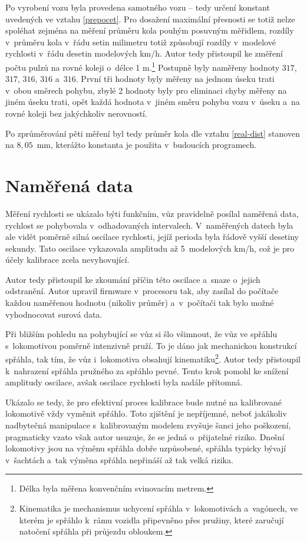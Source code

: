 Po vyrobení vozu byla provedena  samotného vozu -- tedy určení
konstant uvedených ve vztahu \ref{prepocet}. Pro dosažení maximální přesnosti
se totiž nelze spoléhat zejména na měření průměru kola pouhým posuvným
měřidlem, rozdíly v~průměru kola v~řádu setin milimetru totiž způsobují rozdíly
v~modelové rychlosti v~řádu desetin modelových km/h. Autor tedy přistoupil ke
změření počtu pulzů na rovné koleji o~délce 1 m.\footnote{Délka byla měřena
konvenčním svinovacím metrem.} Postupně byly naměřeny hodnoty $317$, $317$,
$316$, $316$ a~$316$. První tři hodnoty byly měřeny na jednom úseku trati
v~obou směrech pohybu, zbylé 2 hodnoty byly pro eliminaci chyby měřeny na
jiném úseku trati, opět každá hodnota v~jiném směru pohybu vozu v~úseku a~na
rovné koleji bez jakýchkoliv nerovností.

Po zprůměrování pěti měření byl tedy průměr kola dle vztahu \ref{real-dist}
stanoven na $8,05$~mm, kterážto konstanta je použita v~budoucích programech.

\section{Naměřená data}
\label{sec:wsm-data}

Měření rychlosti se ukázalo býti funkčním, vůz pravidelně posílal naměřená
data, rychlost se pohybovala v~odhadovaných intervalech. V~naměřených datech
byla ale vidět poměrně silná oscilace rychlosti, jejíž perioda byla řádově
vyšší desetiny sekundy. Tato oscilace vykazovala amplitudu až
5~modelových km/h, což je pro účely kalibrace zcela nevyhovující.

Autor tedy přistoupil ke zkoumání příčin této oscilace a~snaze o~jejich
odstranění. Autor upravil firmware v~procesoru tak, aby zasílal do počítače
každou naměřenou hodnotu (nikoliv průměr) a~v~počítači tak bylo možné
vyhodnocovat surová data.

Při bližším pohledu na pohybující se vůz si šlo všimnout, že vůz ve spřáhlu
s~lokomotivou poměrně intenzivně pruží. To je dáno jak mechanickou konstrukcí
spřáhla, tak tím, že vůz i~lokomotiva obsahují kinematiku\footnote{Kinematika
je mechanismus uchycení spřáhla v~lokomotivách a~vagónech, ve kterém je spřáhlo
k~rámu vozidla připevněno přes pružiny, které zaručují natočení spřáhla při
průjezdu obloukem.}.
Autor tedy přistoupil k~nahrazení spřáhla pružného za spřáhlo pevné. Tento krok
pomohl ke snížení amplitudy oscilace, avšak oscilace rychlosti byla nadále
přítomná.

Ukázalo se tedy, že pro efektivní proces kalibrace bude nutné na kalibrované
lokomotivě vždy vyměnit spřáhlo. Toto zjištění je nepříjemné, neboť
jakákoliv nadbytečná manipulace s~kalibrovaným modelem zvyšuje šanci jeho
poškození, pragmaticky vzato však autor usuzuje, že se jedná o~přijatelné
riziko. Dnešní lokomotivy jsou na výměnu spřáhla dobře uzpůsobené, spřáhla
typicky bývají v~šachtách a~tak výměna spřáhla nepřináší až tak velká rizika.

